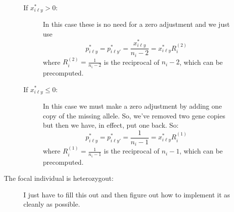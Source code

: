 \documentclass[11pt]{article}
\begin{document}
\begin{description}
\begin{description}
\[		\]
		\begin{description}
			\item [If $x^*_{i\ell y} > 0$:] In this case these is no need for a zero adjustment and we just use
			\[
				p^*_{i\ell y} = p^*_{i\ell y'} = \frac{x^*_{i\ell y}}{n_i - 2} = x^*_{i\ell y} R_i^{(2)}
			\]
			where $R_i^{(2)} = \frac{1}{n_i - 2}$ is the reciprocal of $n_i - 2$, which can be precomputed.
			\item [If $x^*_{i\ell y} \leq 0$:] In this case we must make a zero adjustment by adding one copy of the
			missing allele.  So, we've removed two gene copies but then we have, in effect, put one back.  So:   
			\[
				p^*_{i\ell y} = p^*_{i\ell y'} = \frac{1}{n_i - 1} = x^*_{i\ell y} R_i^{(1)}
			\]
			where $R_i^{(1)} = \frac{1}{n_i - 1}$ is the reciprocal of $n_i - 1$, which can be precomputed.
		\end{description}
		\item [The focal individual is heterozygout:] I just have to fill this out and then figure out how to implement it as cleanly as possible.
	\end{description}

\end{description}




 
\end{document}
